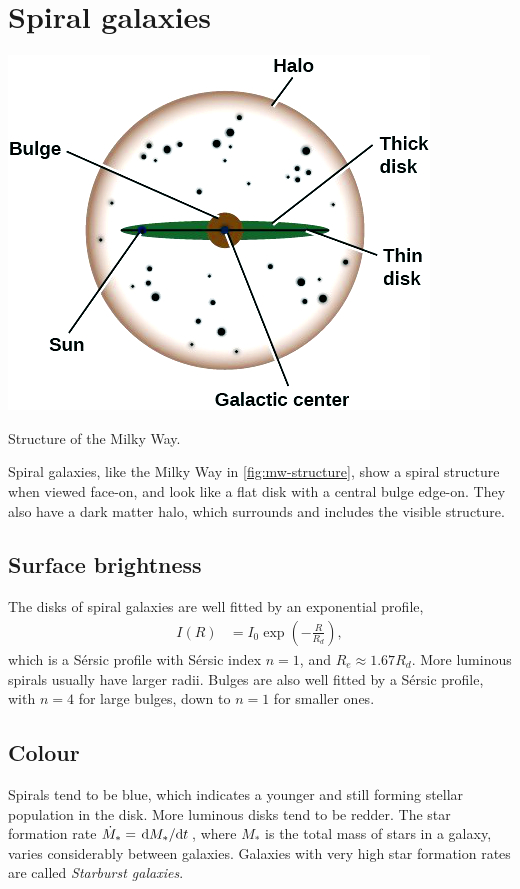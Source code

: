 \section{Spiral galaxies}
\begin{marginfigure}
	\includegraphics[width=\textwidth]{img/ch-05/milky-way.png}
	\caption{Structure of the Milky Way.}
	\label{fig:mw-structure}
\end{marginfigure}
Spiral galaxies, like the Milky Way in \cref{fig:mw-structure}, show a spiral structure when viewed face-on, and look like a flat disk with a central bulge edge-on.
They also have a dark matter halo, which surrounds and includes the visible structure.

\subsection{Surface brightness}
The disks of spiral galaxies are well fitted by an exponential profile,
\begin{align*}
	I(R)
	&= I_0 \exp\left( -\frac{R}{R_d} \right),
\end{align*}
which is a Sérsic profile with Sérsic index $n=1$,
and $R_e \approx 1.67 R_d$.
More luminous spirals usually have larger radii.
Bulges are also well fitted by a Sérsic profile, with $n = 4$ for large bulges, down to $n=1$ for smaller ones.

\subsection{Colour}
Spirals tend to be blue, which indicates a younger and still forming stellar population in the disk.
More luminous disks tend to be redder.
The star formation rate $\dot{M}_* = \dv*{M_*}{t}$, where $M_*$ is the total mass of stars in a galaxy, varies considerably between galaxies.
Galaxies with very high star formation rates are called \emph{Starburst galaxies}.

